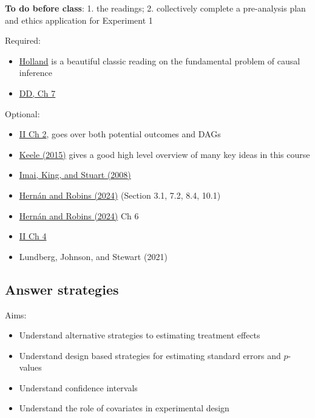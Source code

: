 \documentclass[
  10pt,
  a4paper,10pt]{extarticle}
\providecommand{\tightlist}{%
  \setlength{\itemsep}{0pt}\setlength{\parskip}{0pt}}
\begin{document}
\textbf{To do before class}: 1. the readings; 2. collectively complete a
pre-analysis plan and ethics application for Experiment 1

Required:

\begin{itemize}
\tightlist
\item
  \href{https://www.jstor.org/stable/2289064}{Holland} is a beautiful
  classic reading on the fundamental problem of causal inference
\item
  \href{https://book.declaredesign.org/declaration-diagnosis-redesign/defining-inquiry.html}{DD,
  Ch 7}
\end{itemize}

Optional:

\begin{itemize}
\tightlist
\item
  \href{https://integrated-inferences.github.io/book/02-causal-models.html}{II
  Ch 2}, goes over both potential outcomes and DAGs
\item
  \href{https://hrr.w.uib.no/files/2019/01/Keele_2015_causal.pdf}{Keele
  (2015)} gives a good high level overview of many key ideas in this
  course
\item
  \href{https://gking.harvard.edu/files/matchse.pdf}{Imai, King, and
  Stuart (2008)}
\item
  \href{https://miguelhernan.org/whatifbook}{Hernán and Robins (2024)}
  (Section 3.1, 7.2, 8.4, 10.1)
\item
  \href{https://miguelhernan.org/whatifbook}{Hernán and Robins (2024)}
  Ch 6
\item
  \href{https://macartan.github.io/integrated_inferences/HJC4.html}{II
  Ch 4}
\item
  Lundberg, Johnson, and Stewart (2021)
\end{itemize}

\subsection{Answer strategies}\label{answer-strategies}

Aims:

\begin{itemize}
\tightlist
\item
  Understand alternative strategies to estimating treatment effects
\item
  Understand design based strategies for estimating standard errors and
  \(p\)-values
\item
  Understand confidence intervals
\item
  Understand the role of covariates in experimental design
\end{itemize}
\end{document}
